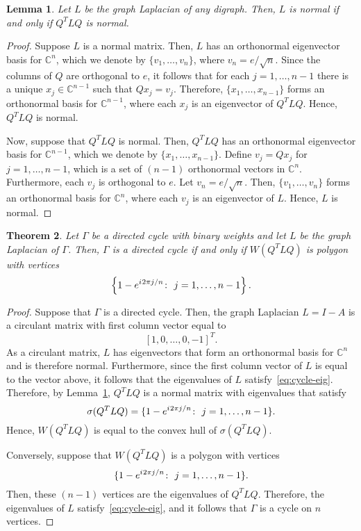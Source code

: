 \documentclass{article}
\newtheorem{theorem}{Theorem}[section]
\newtheorem{lemma}[theorem]{Lemma}
\theoremstyle{definition}
\newcommand{\iu}{{i\mkern1mu}}
\begin{document}
\begin{lemma}\label{lem:normal}
Let $L$ be the graph Laplacian of any digraph.
Then, $L$ is normal if and only if $Q^{T}LQ$ is normal.
\end{lemma}
\begin{proof}
Suppose $L$ is a normal matrix.
Then, $L$ has an orthonormal eigenvector basis for $\mathbb{C}^{n}$, which we denote by $\{v_{1},\ldots,v_{n}\}$, where $v_{n}=e/\sqrt{n}$.
Since the columns of $Q$ are orthogonal to $e$, it follows that for each $j=1,\ldots,n-1$ there is a unique $x_{j}\in\mathbb{C}^{n-1}$ such that $Qx_{j}=v_{j}$.
Therefore, $\{x_{1},\ldots,x_{n-1}\}$ forms an orthonormal basis for $\mathbb{C}^{n-1}$, where each $x_{j}$ is an eigenvector of $Q^{T}LQ$.
Hence, $Q^{T}LQ$ is normal. 

Now, suppose that $Q^{T}LQ$ is normal.
Then, $Q^{T}LQ$ has an orthonormal eigenvector basis for $\mathbb{C}^{n-1}$, which we denote by $\{x_{1},\ldots,x_{n-1}\}$.
Define $v_{j}=Qx_{j}$ for $j=1,\ldots,n-1$, which is a set of $(n-1)$ orthonormal vectors in $\mathbb{C}^{n}$.
Furthermore, each $v_{j}$ is orthogonal to $e$.
Let $v_{n}=e/\sqrt{n}$.
Then, $\{v_{1},\ldots,v_{n}\}$ forms an orthonormal basis for $\mathbb{C}^{n}$, where each $v_{j}$ is an eigenvector of $L$.
Hence, $L$ is normal. 
\end{proof}

\begin{theorem}\label{thm:cycle-qnr}
Let $\Gamma$ be a directed cycle with binary weights and let $L$ be the graph Laplacian of $\Gamma$.
Then, $\Gamma$ is a directed cycle if and only if $W(Q^{T}LQ)$ is polygon with vertices
\[
\left\{1-e^{\iu 2\pi j/n}\colon~j=1,\ldots,n-1\right\}.
\]
\end{theorem}
\begin{proof}
Suppose that $\Gamma$ is a directed cycle.
Then, the graph Laplacian $L=I-A$ is a circulant matrix with first column vector equal to
\[
[1,0,\ldots,0,-1]^{T}.
\]
As a circulant matrix, $L$ has eigenvectors that form an orthonormal basis for $\mathbb{C}^{n}$ and is therefore normal.
Furthermore, since the first column vector of $L$ is equal to the vector above, it follows that the eigenvalues of $L$ satisfy~\eqref{eq:cycle-eig}. 
Therefore, by Lemma~\ref{lem:normal}, $Q^{T}LQ$ is a normal matrix with eigenvalues that satisfy
\[
\sigma(Q^{T}LQ)=\{1-e^{\iu 2\pi j/n}\colon~j=1,\ldots,n-1\}.
\]
Hence, $W(Q^{T}LQ)$ is equal to the convex hull of $\sigma(Q^{T}LQ)$. 

Conversely, suppose that $W(Q^{T}LQ)$ is a polygon with vertices
\[
\{1-e^{\iu 2\pi j/n}\colon~j=1,\ldots,n-1\}.
\]
Then, these $(n-1)$ vertices are the eigenvalues of $Q^{T}LQ$.
Therefore, the eigenvalues of $L$ satisfy~\eqref{eq:cycle-eig}, and it follows that $\Gamma$ is a cycle on $n$ vertices. 
\end{proof}
\end{document}
